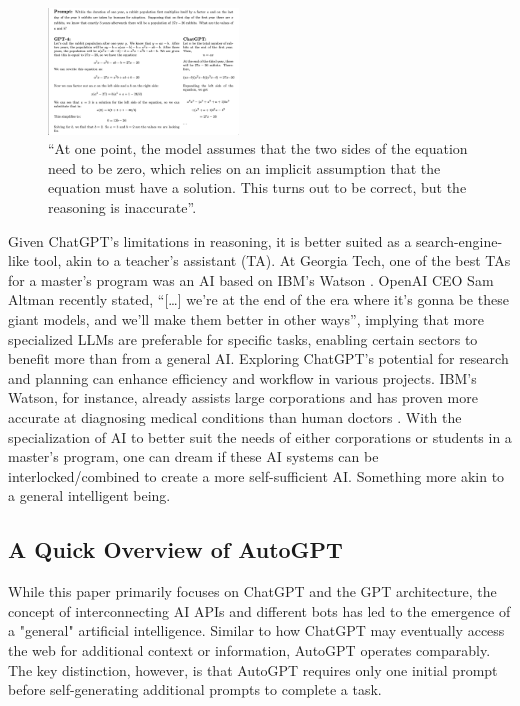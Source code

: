 \documentclass[letterpaper, 10pt, conference]{ieeeconf}
\begin{document}
   \begin{figure}
       \centering
       \includegraphics[width=0.45\textwidth]{images/math_explanation.png}
       \caption{\enquote{At one point, the model assumes that the two sides of the equation need to be zero, which relies on an implicit assumption
       that the equation must have a solution. This turns out to be correct, but the reasoning is inaccurate}\cite{bubeck2023sparks}.}       
       \label{fig:image1}
   \end{figure}
   
        Given ChatGPT's limitations in reasoning, it is better suited as a search-engine-like tool, akin to a teacher's assistant (TA). At Georgia Tech, one of the best TAs for a master's program was an AI based on IBM's Watson \cite{popenici2017}. OpenAI CEO Sam Altman recently stated, 
        \enquote{[…] we're at the end of the era where it's gonna be these giant models, and we'll make them better in other ways}\cite{miller2023}, implying that more specialized LLMs are preferable for specific tasks, enabling certain sectors to benefit more than from a general AI. Exploring ChatGPT's potential for research and planning can enhance efficiency and workflow in various projects. IBM's Watson, for instance, already assists large corporations and has proven more accurate at diagnosing medical conditions than human doctors \cite{popenici2017}. 
        With the specialization of AI to better suit the needs of either corporations or students in a master's program, one can dream if these AI systems can be interlocked/combined to create a more self-sufficient AI. Something more akin to a general intelligent being.

    \subsection{A Quick Overview of AutoGPT}
        While this paper primarily focuses on ChatGPT and the GPT architecture, the concept of interconnecting AI APIs and different bots has led to the emergence of a "general" artificial intelligence. Similar to how ChatGPT may eventually access the web for additional context or information, AutoGPT operates comparably. The key distinction, however, is that AutoGPT requires only one initial prompt before self-generating additional prompts to complete a task\cite{matt2023}.
\end{document}

